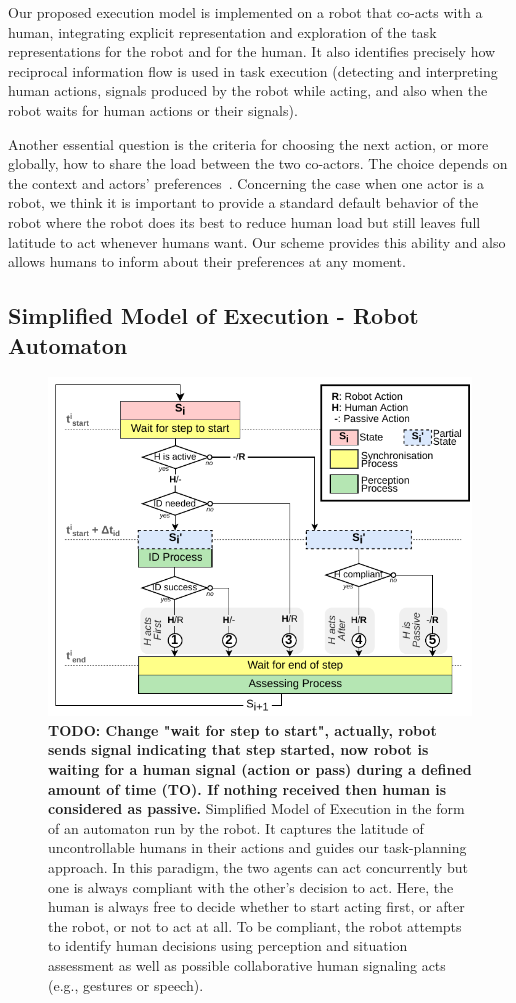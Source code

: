 Our proposed execution model is implemented on a robot that co-acts with a human, integrating explicit representation and exploration of the task representations for the robot and for the human. 
It also identifies precisely how reciprocal information flow is used in task execution (detecting and interpreting human actions, signals produced by the robot while acting, and also when the robot waits for human actions or their signals).

Another essential question is the criteria for choosing the next action, or more globally, how to share the load between the two co-actors. The choice depends on the context and actors' preferences~\cite{Gombolay-2015, Strachan-2020, Curioni-2022}. 
Concerning the case when one actor is a robot, we think it is important to provide a standard default behavior of the robot where the robot does its best to reduce human load but still leaves full latitude to act whenever humans want. 
Our scheme provides this ability and also allows humans to inform about their preferences at any moment.

\subsection{Simplified Model of Execution - Robot Automaton}

\begin{figure}
    \centering
    \includegraphics[width=0.8\linewidth]{images/Chapter4/simplified_automaton.pdf}
    \caption{
    \textbf{TODO: Change "wait for step to start", actually, robot sends signal indicating that step started, now robot is waiting for a human signal (action or pass) during a defined amount of time (TO). If nothing received then human is considered as passive.}
    Simplified Model of Execution in the form of an automaton run by the robot. It captures the latitude of uncontrollable humans in their actions and guides our task-planning approach.
    In this paradigm, the two agents can act concurrently but one is always compliant with the other's decision to act.
    Here, the human is always free to decide whether to start acting first, or after the robot, or not to act at all.
    To be compliant, the robot attempts to identify human decisions using perception and situation assessment as well as possible collaborative human signaling acts (e.g., gestures or speech).
    }
    \label{fig:model_of_execution}
\end{figure}

